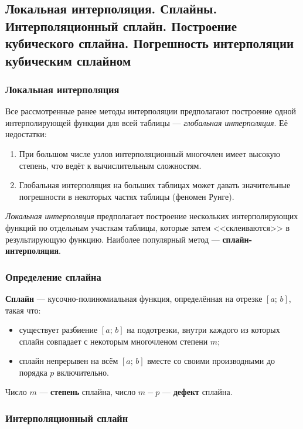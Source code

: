 \newpage
\subsection{Локальная интерполяция. Сплайны. Интерполяционный сплайн. Построение кубического сплайна. Погрешность интерполяции кубическим сплайном}

\subsubsection*{Локальная интерполяция}

Все рассмотренные ранее методы интерполяции предполагают построение одной интерполирующей функции для всей таблицы --- \textit{глобальная интерполяция}. Её недостатки:
\begin{enumerate}
    \item При большом числе узлов интерполяционный многочлен имеет высокую степень, что ведёт к вычислительным сложностям.
    \item Глобальная интерполяция на больших таблицах может давать значительные погрешности в некоторых частях таблицы (феномен Рунге).
\end{enumerate}

\textit{Локальная интерполяция} предполагает построение нескольких интерполирующих функций по отдельным участкам таблицы, которые затем <<склеиваются>> в результирующую функцию. Наиболее популярный метод --- \textbf{сплайн-интерполяция}.

\subsubsection*{Определение сплайна}

\textbf{Сплайн} --- кусочно-полиномиальная функция, определённая на отрезке $[a;\,b]$, такая что:
\begin{itemize}
    \item существует разбиение $[a;\,b]$ на подотрезки, внутри каждого из которых сплайн совпадает с некоторым многочленом степени $m$;
    \item сплайн непрерывен на всём $[a;\,b]$ вместе со своими производными до порядка $p$ включительно.
\end{itemize}

Число $m$ --- \textbf{степень} сплайна, число $m - p$ --- \textbf{дефект} сплайна.

\subsubsection*{Интерполяционный сплайн}

